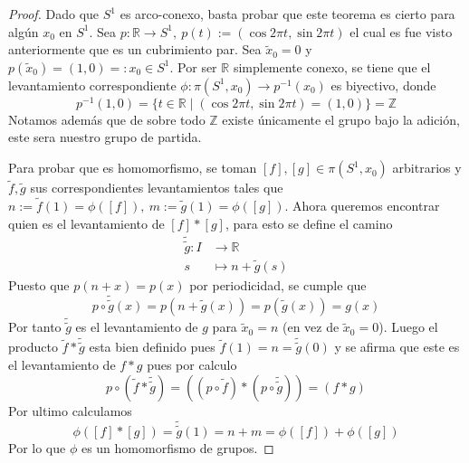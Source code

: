 \begin{proof}
  Dado que \(S^1\) es arco-conexo, basta probar que este teorema es
  cierto para algún \(x_0\) en \(S^1\). Sea \(p : \mathbb R \to S^1,\
  p(t) := (\cos 2 \pi t, \sin 2 \pi t)\) el cual es fue visto anteriormente
  que es un cubrimiento par. Sea \(\tilde x _0 = 0\) y \( p(\tilde x _0) =
  (1,0) =: x_0 \in S^1\). Por ser \(\mathbb R\) simplemente conexo, se
  tiene que el levantamiento correspondiente \(\phi : \pi (S^1, x_0) \to
  p^{-1} (x_0)\) es biyectivo, donde
  \[ p^{-1} (1,0) = \{t \in \mathbb R \mid (\cos 2 \pi t, \sin 2 \pi t)
    = (1, 0) \} = \mathbb Z \]
  Notamos además que de sobre todo \(\mathbb Z\) existe únicamente el
  grupo bajo la adición, este sera nuestro grupo de partida.

  Para probar que es homomorfismo, se toman \([f], [g] \in \pi
  (S^1, x_0)\) arbitrarios y \(\tilde f, \tilde g\) sus correspondientes
  levantamientos tales que \(n := \tilde f (1) = \phi ([f]),\ m :=
  \tilde g (1) = \phi ([g])\). Ahora queremos encontrar quien es el
  levantamiento de \([f] * [g]\), para esto se define el camino
  \begin{align*}
    \tilde{\tilde g} : I &\longrightarrow \mathbb R \\
    s &\longmapsto n + \tilde g (s)
  \end{align*}
  Puesto que \(p(n + x) = p(x)\) por periodicidad, se cumple que
  \[ p \circ \tilde{\tilde g} (x) = p (n + \tilde g (x)) = p (\tilde g
    (x)) = g (x) \]
  Por tanto \(\tilde{\tilde g}\) es el levantamiento de \(g\) para
  \(\tilde x_0 = n\) (en vez de \(\tilde x_0 = 0\)). Luego el producto
  \(\tilde f * \tilde{\tilde g}\) esta bien definido pues \(\tilde f (1)
  = n = \tilde{\tilde g} (0)\) y se afirma que este es el levantamiento
  de \(f * g\) pues por calculo
  \[ p \circ (\tilde f * \tilde{\tilde g}) =
     ((p \circ \tilde f) * (p \circ \tilde{\tilde g})) =
     (f * g)
  \]
  Por ultimo calculamos
  \[ \phi ([f] * [g]) = \tilde{\tilde g} (1) = n + m = \phi ([f]) + \phi
  ([g]) \]
  Por lo que \(\phi\) es un homomorfismo de grupos.
\end{proof}

